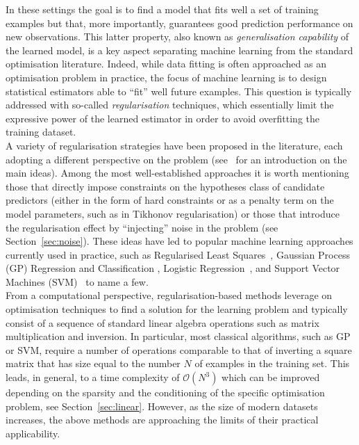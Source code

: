 \documentclass[a4paper, 11pt]{article}
\begin{document}
In these settings the goal is to find a model that fits well a set of training examples but that, more importantly, guarantees good prediction performance on new observations. This latter property, also known as {\em generalisation capability} of the learned model, is a key aspect separating machine learning from the standard optimisation literature. Indeed, while data fitting is often approached as an optimisation problem in practice, the focus of machine learning is to design statistical estimators able to ``fit'' well future examples. This question is typically addressed with so-called {\em regularisation} techniques, which essentially limit the expressive power of the learned estimator in order to avoid overfitting the training dataset.\\

A variety of regularisation strategies have been proposed in the literature, each adopting a different perspective on the problem (see~\cite{vapnik1998,bishop2006pattern,bauer2007regularization} for an introduction on the main ideas). Among the most well-established approaches it is worth mentioning those that directly impose constraints on the hypotheses class of candidate predictors (either in the form of hard constraints or as a penalty term on the model parameters, such as in Tikhonov regularisation) or those that introduce the regularisation effect by ``injecting'' noise in the problem (see Section~\ref{sec:noise}). These ideas have led to popular machine learning approaches currently used in practice, such as Regularised Least Squares~\cite{cucker2002}, Gaussian Process (GP) Regression and Classification \cite{rasmussen2006}, Logistic Regression~\cite{bishop2006pattern}, and Support Vector Machines (SVM)~\cite{vapnik1998} to name a few.\\

From a computational perspective, regularisation-based methods leverage on optimisation techniques to find a solution for the learning problem and typically consist of a sequence of standard linear algebra operations such as matrix multiplication and inversion. In particular, most classical algorithms, such as GP or SVM, require a number of operations comparable to that of inverting a square matrix that has size equal to the number $N$ of examples in the training set. This leads, in general, to a time complexity of $\mathcal O(N^3)$ which can be improved depending on the sparsity and the conditioning of the specific optimisation problem, see Section~\ref{sec:linear}. However, as the size of modern datasets increases, the above methods are approaching the limits of their practical applicability. \\
\end{document}
